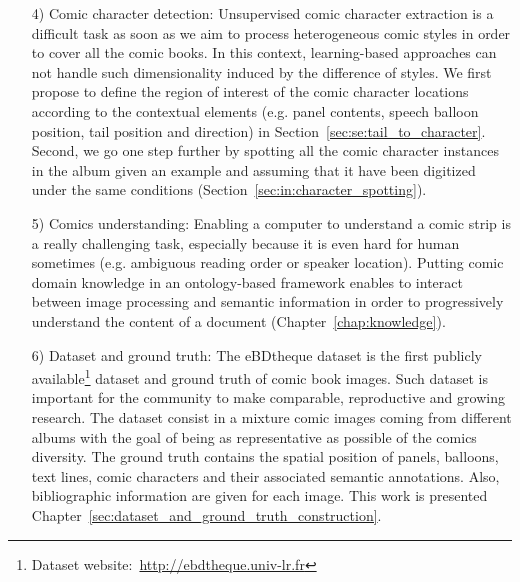 \begin{itemize}
	
	\item [4)] Comic character detection: Unsupervised comic character extraction is a difficult task as soon as we aim to process heterogeneous comic styles in order to cover all the comic books.
	In this context, learning-based approaches can not handle such dimensionality induced by the difference of styles.
	We first propose to define the region of interest of the comic character locations according to the contextual elements (e.g. panel contents, speech balloon position, tail position and direction) in Section~\ref{sec:se:tail_to_character}.
	Second, we go one step further by spotting all the comic character instances in the album given an example and assuming that it have been digitized under the same conditions (Section~\ref{sec:in:character_spotting}).
	
	

	\item [5)] Comics understanding: Enabling a computer to understand a comic strip is a really challenging task, especially because it is even hard for human sometimes (e.g. ambiguous reading order or speaker location).
	Putting comic domain knowledge in an ontology-based framework enables to interact between image processing and semantic information in order to progressively understand the content of a document (Chapter~\ref{chap:knowledge}).

	\item[6)] Dataset and ground truth: The eBDtheque dataset is the first publicly available\footnote{Dataset website:~\url{http://ebdtheque.univ-lr.fr}} dataset and ground truth of comic book images.
	Such dataset is important for the community to make comparable, reproductive and growing research.
	The dataset consist in a mixture comic images coming from different albums with the goal of being as representative as possible of the comics diversity.
	The ground truth contains the spatial position of panels, balloons, text lines, comic characters and their associated semantic annotations.
	Also, bibliographic information are given for each image.
	This work is presented Chapter~\ref{sec:dataset_and_ground_truth_construction}.


\end{itemize}


